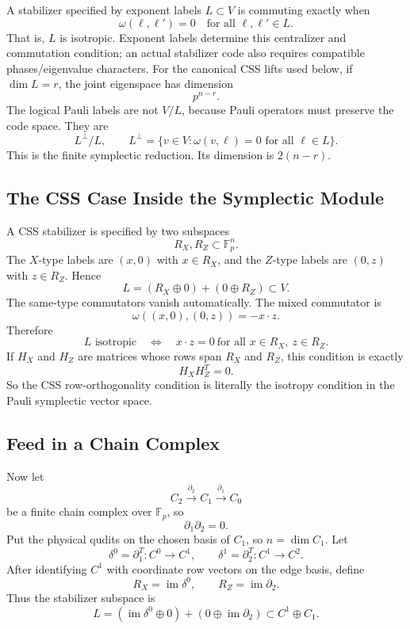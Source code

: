 A stabilizer specified by exponent labels \(L\subset V\) is commuting exactly
when
\[
  \omega(\ell,\ell')=0\quad\text{for all }\ell,\ell'\in L.
\]
That is, \(L\) is isotropic. Exponent labels determine this centralizer and
commutation condition; an actual stabilizer code also requires compatible
phases/eigenvalue characters. For the canonical CSS lifts used below, if
\(\dim L=r\), the joint eigenspace has dimension
\[
  p^{n-r}.
\]
The logical Pauli labels are not \(V/L\), because Pauli operators must preserve
the code space. They are
\[
  L^\perp/L,\qquad
  L^\perp=\{v\in V:\omega(v,\ell)=0\text{ for all }\ell\in L\}.
\]
This is the finite symplectic reduction. Its dimension is \(2(n-r)\).

\subsection{The CSS Case Inside the Symplectic Module}

A CSS stabilizer is specified by two subspaces
\[
  R_X,R_Z\subset \mathbb F_p^n.
\]
The \(X\)-type labels are \((x,0)\) with \(x\in R_X\), and the \(Z\)-type labels
are \((0,z)\) with \(z\in R_Z\). Hence
\[
  L=(R_X\oplus 0)+(0\oplus R_Z)\subset V.
\]
The same-type commutators vanish automatically. The mixed commutator is
\[
  \omega((x,0),(0,z))=-x\cdot z .
\]
Therefore
\[
  L\text{ isotropic}
  \quad\Longleftrightarrow\quad
  x\cdot z=0\ \text{for all }x\in R_X,\ z\in R_Z.
\]
If \(H_X\) and \(H_Z\) are matrices whose rows span \(R_X\) and \(R_Z\), this
condition is exactly
\[
  H_XH_Z^T=0.
\]
So the CSS row-orthogonality condition is literally the isotropy condition in
the Pauli symplectic vector space.

\subsection{Feed in a Chain Complex}

Now let
\[
  C_2\xrightarrow{\partial_2}C_1\xrightarrow{\partial_1}C_0
\]
be a finite chain complex over \(\mathbb F_p\), so
\[
  \partial_1\partial_2=0.
\]
Put the physical qudits on the chosen basis of \(C_1\), so \(n=\dim C_1\). Let
\[
  \delta^0=\partial_1^T:C^0\to C^1,\qquad
  \delta^1=\partial_2^T:C^1\to C^2 .
\]
After identifying \(C^1\) with coordinate row vectors on the edge basis, define
\[
  R_X=\operatorname{im}\delta^0,\qquad
  R_Z=\operatorname{im}\partial_2.
\]
Thus the stabilizer subspace is
\[
  L=(\operatorname{im}\delta^0\oplus 0)
    +(0\oplus \operatorname{im}\partial_2)
  \subset C^1\oplus C_1 .
\]

